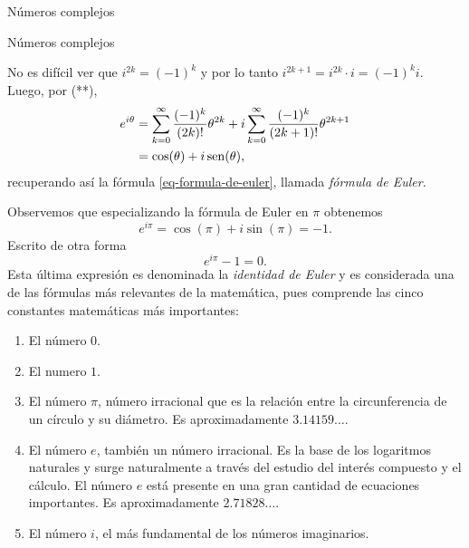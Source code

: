 \begin{chapter}{N\'umeros complejos}
\begin{section}{N\'umeros complejos}
\begin{observacion*}
            No es difícil ver que $i^{2k} = (-1)^k$ y por lo tanto $i^{2k+1} = i^{2k}\cdot i = (-1)^ki $. Luego, por (**), 
            \begin{align*}
                e^{i\theta} &=  \sum_{k=0}^{\infty} \frac{(-1)^k}{(2k)!}\theta^{2k}  + i\sum_{k=0}^{\infty} \frac{ (-1)^k}{(2k+1)!}\theta^{2k+1} \\
                &=\cos(\theta) + i \operatorname{sen}(\theta), 
            \end{align*}
            recuperando así  la fórmula \eqref{eq-formula-de-euler}, llamada \emph{fórmula de Euler.} 
        \end{observacion*}

        \begin{observacion*}  Observemos que especializando la fórmula de Euler en $\pi$ obtenemos 
            \begin{equation*}
                    e^{i\pi} = \cos(\pi) + i\sin(\pi) = -1.
            \end{equation*}
            Escrito de otra forma
            \begin{equation}
                e^{i\pi} -1 =0.
            \end{equation}
            Esta última expresión es denominada la \emph{identidad de Euler} y es considerada una de las fórmulas más relevantes de la matemática, pues comprende las cinco constantes matemáticas más importantes: 
            \begin{enumerate}
                \item El número \boldmath${0}$.
                \item El numero \boldmath${1}$.
                \item El número \boldmath${\pi}$, número irracional  que es la relación entre la circunferencia de un círculo y su diámetro. Es aproximadamente $3.14159\ldots$.
                \item El número \boldmath${e}$, también un número irracional. Es la base de los logaritmos naturales y surge naturalmente a través del estudio del interés compuesto y el cálculo. El número $e$ está presente en una gran cantidad de ecuaciones importantes. Es aproximadamente $2.71828\ldots$.
                \item El número \boldmath$i$, el más fundamental de los números imaginarios.
            \end{enumerate}
        \end{observacion*}
        
    \end{section}	
\end{chapter}





